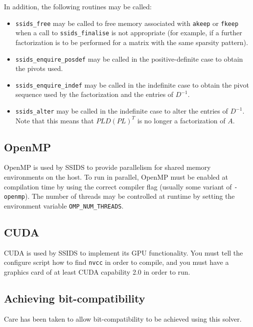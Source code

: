 \documentclass{spral}
\begin{document}
\noindent
In addition, the following routines may be called:
\begin{itemize}
\item {\tt ssids\_free} may be called to free memory associated with {\tt akeep}
or {\tt fkeep} when a call to {\tt ssids\_finalise} is not appropriate (for
example, if a further factorization is to be performed for a matrix with the
same sparsity pattern).
\item {\tt ssids\_enquire\_posdef} may be called
in the  positive-definite case to obtain the pivots used.
\item {\tt ssids\_enquire\_indef} may be called
in the indefinite case to obtain the pivot sequence used by the factorization
and the entries of  ${D}^{-1}$.
\item {\tt ssids\_alter} may be called in the indefinite case to alter
the entries of ${D}^{-1}$.
Note that this means that  $PLD(PL)^T$ is no longer
a factorization of $A$.

\end{itemize}


\subsection{OpenMP} \label{openmp}
OpenMP is used by SSIDS to provide parallelism for
shared memory environments on the host.  To run in parallel, OpenMP must be
enabled at
compilation time by using the correct compiler flag (usually some variant of
{\tt -openmp}). The number of threads may be controlled at runtime
by setting the environment variable {\tt OMP\_NUM\_THREADS}.

\subsection{CUDA} \label{CUDA}
CUDA is used by SSIDS to implement its GPU functionality. You must tell the
configure script how to find {\tt nvcc} in order to compile, and you must have
a graphics card of at least CUDA capability 2.0 in order to run.

\subsection{Achieving bit-compatibility} \label{bitcompat}
Care has been taken to allow bit-compatibility to be achieved using this solver.

\end{document}

